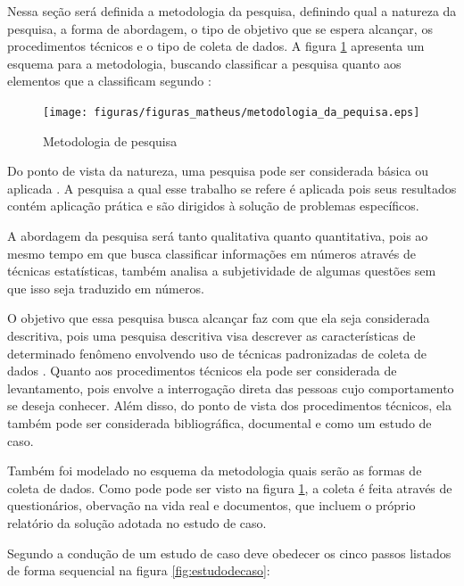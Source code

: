 Nessa seção será definida a metodologia da pesquisa, definindo qual a natureza da pesquisa, a forma de abordagem, o tipo de objetivo que se espera alcançar, os procedimentos técnicos e o tipo de coleta de dados. A figura \ref{fig:metodologiadepesquisa} apresenta um esquema para a metodologia, buscando classificar a pesquisa quanto aos elementos que a classificam segundo :

\begin{figure}[h!]
\centering
\texttt{[image: figuras/figuras\_matheus/metodologia\_da\_pequisa.eps]}
\caption{Metodologia de pesquisa}
\label{fig:metodologiadepesquisa}
\end{figure}
\FloatBarrier

Do ponto de vista da natureza, uma pesquisa pode ser considerada básica ou aplicada \cite{metodologia_edna}. A pesquisa a qual esse trabalho se refere é aplicada pois seus resultados contém aplicação prática e são dirigidos à solução de problemas específicos.

A abordagem da pesquisa será tanto qualitativa quanto quantitativa, pois ao mesmo tempo em que busca classificar informações em números através de técnicas estatísticas, também analisa a subjetividade de algumas questões sem que isso seja traduzido em números.

O objetivo que essa pesquisa busca alcançar faz com que ela seja considerada descritiva, pois uma pesquisa descritiva visa descrever as características de determinado fenômeno envolvendo uso de técnicas padronizadas de coleta de dados \cite{metodologia_edna}. Quanto aos procedimentos técnicos ela pode ser considerada de levantamento, pois envolve a interrogação direta das pessoas cujo comportamento se deseja conhecer. Além disso, do ponto de vista dos procedimentos técnicos, ela também pode ser considerada bibliográfica, documental e como um estudo de caso.

Também foi modelado no esquema da metodologia quais serão as formas de coleta de dados. Como pode pode ser visto na figura \ref{fig:metodologiadepesquisa}, a coleta é feita através de questionários, obervação na vida real e documentos, que incluem o próprio relatório da solução adotada no estudo de caso.

Segundo  a condução de um estudo de caso deve obedecer os cinco passos listados de forma sequencial na figura \ref{fig:estudodecaso}: 


